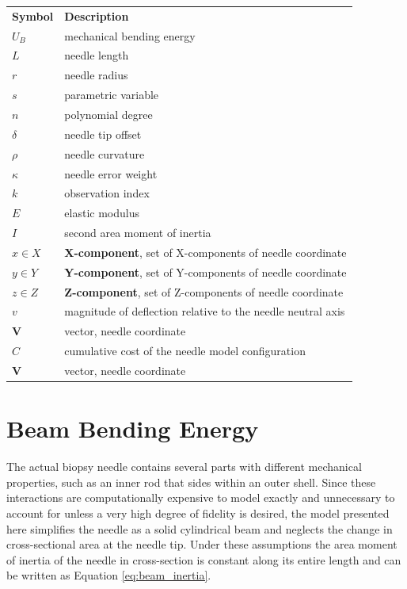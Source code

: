 \begin{tabular}{@{}ll@{}} 
\textbf{Symbol} & \textbf{Description} \\
$U_B$ & mechanical bending energy \\
$L$ & needle length \\
$r$ & needle radius \\
$s$ & parametric variable \\
$n$ & polynomial degree \\
$\delta$ & needle tip offset \\
$\rho$ & needle curvature \\
$\kappa$ & needle error weight \\
$k$ & observation index \\
$E$ & elastic modulus \\
$I$ & second area moment of inertia \\
$x \in X$ & \textbf{X-component}, set of X-components of needle coordinate \\
$y \in Y$ & \textbf{Y-component}, set of Y-components of needle coordinate \\
$z \in Z$ & \textbf{Z-component}, set of Z-components of needle coordinate \\
$v $ & magnitude of deflection relative to the needle neutral axis \\
$\textbf{V}$ & vector, needle coordinate \\

$C$ & cumulative cost of the needle model configuration \\
$\textbf{V}$ & vector, needle coordinate \\

\end{tabular}

\section{Beam Bending Energy}
The actual biopsy needle contains several parts with different mechanical properties, such as an inner rod that sides within an outer shell. Since these interactions are computationally expensive to model exactly and unnecessary to account for unless a very high degree of fidelity is desired, the model presented here simplifies the needle as a solid cylindrical beam and neglects the change in cross-sectional area at the needle tip. Under these assumptions the area moment of inertia of the needle in cross-section is constant along its entire length and can be written as Equation \ref{eq:beam_inertia}. 

